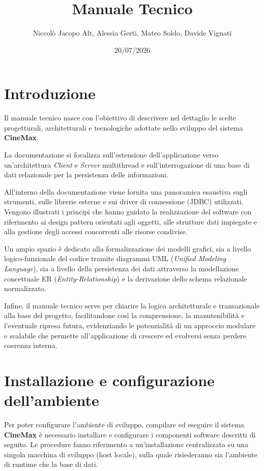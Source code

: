 \documentclass[12pt, a4paper]{article}
\title{Manuale Tecnico}
\author{Niccolò Jacopo Alt, Alessia Gerti, Mateo Soldo, Davide Vignati}
\date{20/07/2026}
\begin{document}
\newpage

\maketitle
\newpage
\tableofcontents
\newpage
\maketitle

\section{Introduzione}
Il manuale tecnico nasce con l'obiettivo di descrivere nel dettaglio le scelte progetturali, architetturali e tecnologiche adottate nello sviluppo del sistema \textbf{CineMax}. 

La documentazione si focalizza sull'estensione dell'applicazione verso un'architettura \textit{Client} e \textit{Server} multithread e sull'interrogazione di una base di dati relazionale per la persistenza delle informazioni. 

All'interno della documentazione viene fornita una panoramica esaustiva sugli strumenti, sulle librerie esterne e sui driver di connessione (JDBC) utilizzati. Vengono illustrati i principi che hanno guidato la realizzazione del software con riferimento ai design pattern orientati agli oggetti, alle strutture dati impiegate e alla gestione degli accessi concorrenti alle risorse condivise.

Un ampio spazio è dedicato alla formalizzazione dei modelli grafici, sia a livello logico-funzionale del codice tramite diagrammi UML (\textit{Unified Modeling Language}), sia a livello della persistenza dei dati attraverso la modellazione concettuale ER (\textit{Entity-Relationship}) e la derivazione dello schema relazionale normalizzato. 

Infine, il manuale tecnico serve per chiarire la logica architetturale e transazionale alla base del progetto, facilitandone così la comprensione, la manutenibilità e l'eventuale ripresa futura, evidenziando le potenzialità di un approccio modulare e scalabile che permette all'applicazione di crescere ed evolversi senza perdere coerenza interna.


\section{Installazione e configurazione dell'ambiente}
Per poter configurare l'ambiente di sviluppo, compilare ed eseguire il sistema \textbf{CineMax} è necessario installare e configurare i componenti software descritti di seguito. Le procedure fanno riferimento a un'installazione centralizzata su una singola macchina di sviluppo (host locale), sulla quale risiederanno sia l'ambiente di runtime che la base di dati.
\end{document}
